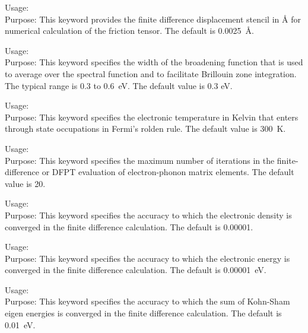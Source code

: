  {
\noindent
Usage:  \\
Purpose: This keyword provides the finite difference displacement stencil  in \AA{} for numerical calculation of the friction tensor. The default is 0.0025~\AA.
}

 {
\noindent
Usage:  \\
Purpose: This keyword specifies the width of the broadening function that is used to average over the spectral function and to facilitate Brillouin zone integration. The typical range is 0.3 to 0.6~eV. The default value is 0.3 eV.\\
}

 {
\noindent
Usage:  \\
Purpose: This keyword specifies the electronic temperature in Kelvin that enters through state occupations in Fermi's rolden rule. The default value is 300~K.  \\
}

 {
\noindent
Usage:  \\
Purpose: This keyword specifies the maximum number of iterations in the finite-difference or DFPT evaluation of electron-phonon matrix elements. The default value is 20. \\
}

 {
\noindent
Usage:  \\
Purpose: This keyword specifies the accuracy to which the electronic density is converged in the finite difference calculation. The default is 0.00001.\\
}

 {
\noindent
Usage:  \\
Purpose: This keyword specifies the accuracy to which the electronic energy is converged in the finite difference calculation. The default is 0.00001~eV.\\
}

 {
\noindent
Usage:  \\
Purpose: This keyword specifies the accuracy to which the sum of Kohn-Sham eigen energies is converged in the finite difference calculation. The default is 0.01~eV.\\
}

